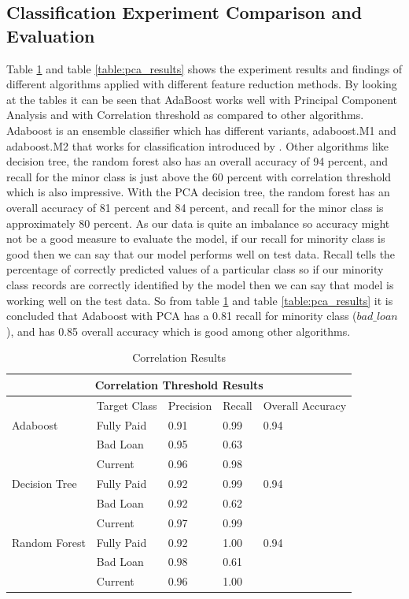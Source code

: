 \documentclass[12pt]{article}
\begin{document}
\subsection{Classification Experiment Comparison and Evaluation}
Table \ref{table:correlation_results} and table \ref{table:pca_results} shows the experiment results and findings of different algorithms applied with different feature reduction methods. By looking at the tables it can be seen that AdaBoost works well with Principal Component Analysis and with Correlation threshold as compared to other algorithms. Adaboost is an ensemble classifier which has different variants, adaboost.M1 and adaboost.M2 that works for classification introduced by \citep{adaboost}. Other algorithms like decision tree, the random forest also has an overall accuracy of 94 percent, and recall for the minor class is just above the 60 percent with correlation threshold which is also impressive. With the PCA decision tree, the random forest has an overall accuracy of 81 percent and 84 percent, and recall for the minor class is approximately 80 percent. As our data is quite an imbalance so accuracy might not be a good measure to evaluate the model, if our recall for minority class is good then we can say that our model performs well on test data. Recall tells the percentage of correctly predicted values of a particular class so if our minority class records are correctly identified by the model then we can say that model is working well on the test data. So from table \ref{table:correlation_results} and table \ref{table:pca_results} it is concluded that Adaboost with PCA has a 0.81 recall for minority class ($bad\_loan$), and has 0.85 overall accuracy which is good among other algorithms.  
\begin{table}[h!]
	\centering
	\begin{tabular}{ |p{3cm}||p{2cm}|p{2cm}|p{2cm}|p{2cm}|  }
		\hline
		\multicolumn{5}{|c|}{Correlation Threshold Results} \\
		\hline
		& Target Class & Precision & Recall & Overall Accuracy \\
		\hline
		Adaboost & Fully Paid & 0.91 & 0.99 & 0.94\\
					  & Bad Loan & 0.95   & 0.63 & \\
					  & Current &0.96 & 0.98 & \\
		\hline
		Decision Tree & Fully Paid & 0.92 & 0.99 & 0.94\\
		& Bad Loan & 0.92 &  0.62 & \\
		& Current &0.97 & 0.99 & \\
		\hline
		Random Forest & Fully Paid & 0.92  & 1.00 & 0.94\\
		& Bad Loan & 0.98  &  0.61 & \\
		& Current & 0.96   &   1.00 & \\
		\hline
	\end{tabular}
	\caption{Correlation Results}
	\label{table:correlation_results}
\end{table}
\end{document}
